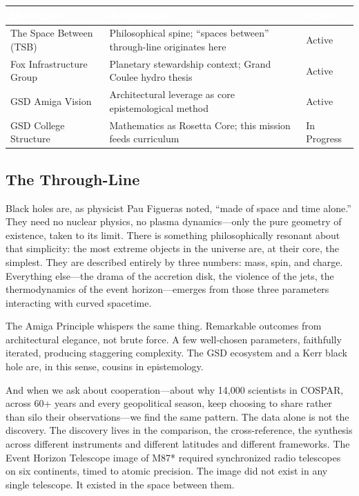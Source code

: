 \documentclass[11pt,letterpaper]{article}
\newcommand{\tableheader}[1]{\textbf{\sffamily\textcolor{white}{#1}}}
\begin{document}
\begin{center}
\begin{tabularx}{\textwidth}{L{4cm}L{5cm}L{4cm}}
\toprule
{}
\tableheader{Document} & \tableheader{Relationship} & \tableheader{Status} \\
\midrule
The Space Between (TSB) & Philosophical spine; ``spaces between'' through-line originates here & Active \\
Fox Infrastructure Group & Planetary stewardship context; Grand Coulee hydro thesis & Active \\
GSD Amiga Vision & Architectural leverage as core epistemological method & Active \\
GSD College Structure & Mathematics as Rosetta Core; this mission feeds curriculum & In Progress \\
\bottomrule
\end{tabularx}
\end{center}

\subsection{The Through-Line}

Black holes are, as physicist Pau Figueras noted, ``made of space and time alone.'' They need no nuclear physics, no plasma dynamics---only the pure geometry of existence, taken to its limit. There is something philosophically resonant about that simplicity: the most extreme objects in the universe are, at their core, the simplest. They are described entirely by three numbers: mass, spin, and charge. Everything else---the drama of the accretion disk, the violence of the jets, the thermodynamics of the event horizon---emerges from those three parameters interacting with curved spacetime.

The Amiga Principle whispers the same thing. Remarkable outcomes from architectural elegance, not brute force. A few well-chosen parameters, faithfully iterated, producing staggering complexity. The GSD ecosystem and a Kerr black hole are, in this sense, cousins in epistemology.

And when we ask about cooperation---about why 14,000 scientists in COSPAR, across 60+ years and every geopolitical season, keep choosing to share rather than silo their observations---we find the same pattern. The data alone is not the discovery. The discovery lives in the comparison, the cross-reference, the synthesis across different instruments and different latitudes and different frameworks. The Event Horizon Telescope image of M87* required synchronized radio telescopes on six continents, timed to atomic precision. The image did not exist in any single telescope. It existed in the space between them.
\end{document}
